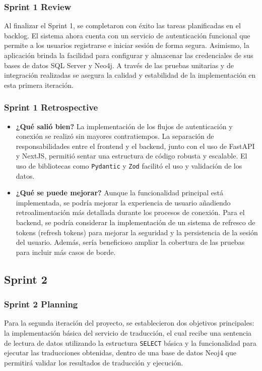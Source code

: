 \subsubsection{Sprint 1 Review}
Al finalizar el Sprint 1, se completaron con éxito las tareas planificadas en el backlog. El sistema ahora cuenta con un servicio de autenticación funcional que permite a los usuarios registrarse e iniciar sesión de forma segura. Asimismo, la aplicación brinda la facilidad para configurar y almacenar las credenciales de sus bases de datos SQL Server y Neo4j. A través de las pruebas unitarias y de integración realizadas se asegura la calidad y estabilidad de la implementación en esta primera iteración.

\subsubsection{Sprint 1 Retrospective}
\begin{itemize}
    \item \textbf{¿Qué salió bien?} \newline
    La implementación de los flujos de autenticación y conexión se realizó sin mayores contratiempos. La separación de responsabilidades entre el frontend y el backend, junto con el uso de FastAPI y NextJS, permitió sentar una estructura de código robusta y escalable. El uso de bibliotecas como \texttt{Pydantic} y \texttt{Zod} facilitó el uso y validación de los datos.
    
    \item \textbf{¿Qué se puede mejorar?} \newline
    Aunque la funcionalidad principal está implementada, se podría mejorar la experiencia de usuario añadiendo retroalimentación más detallada durante los procesos de conexión. Para el backend, se podría considerar la implementación de un sistema de refresco de tokens (refresh tokens) para mejorar la seguridad y la persistencia de la sesión del usuario. Además, sería beneficioso ampliar la cobertura de las pruebas para incluir más casos de borde.
    
\end{itemize}


\subsection{Sprint 2}
\subsubsection{Sprint 2 Planning}
Para la segunda iteración del proyecto, se establecieron dos objetivos principales: la implementación básica del servicio de traducción, el cual recibe una sentencia de lectura de datos utilizando la estructura \texttt{SELECT} básica y la funcionalidad para ejecutar las traducciones obtenidas, dentro de una base de datos Neoj4 que permitirá validar los resultados de traducción y ejecución.

